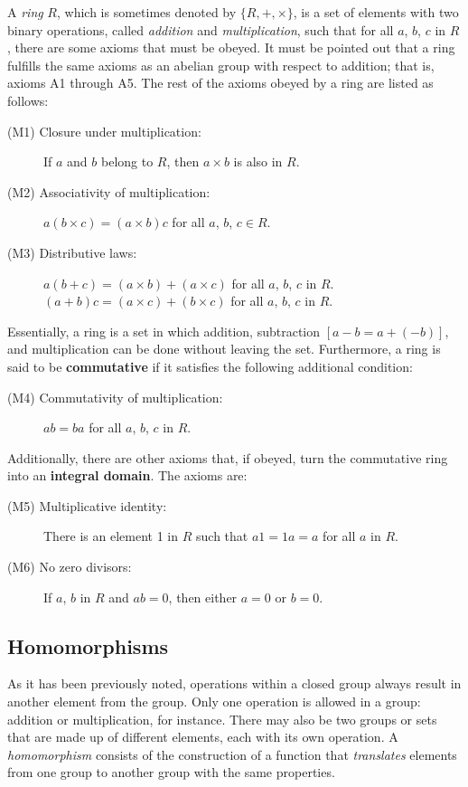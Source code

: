 A \emph{ring} $R$, which is sometimes denoted by $\{R, +, \times \}$, is a set of elements with two binary operations, called \textit{addition} and \textit{multiplication}, such that for all $a$, $b$, $c$ in $R$, there are some axioms that must be obeyed. It must be pointed out that a ring fulfills the same axioms as an abelian group with respect to addition; that is, axioms A1 through A5. The rest of the axioms obeyed by a ring are listed as follows:
\begin{description}
\item[(M1) Closure under multiplication:] If $a$ and $b$ belong to $R$, then $a \times b$ is also in $R$.
\item[(M2) Associativity of multiplication:] $a(b \times c) = (a \times b)c$ for all $a$, $b$, $c \in R$.
\item[(M3) Distributive laws:] $a(b+c) = (a \times b) + (a \times c)$ for all $a$, $b$, $c$ in $R$. \\ $(a+b)c = (a \times c) + (b \times c)$ for all $a$, $b$, $c$ in $R$.
\end{description}

Essentially, a ring is a set in which addition, subtraction $[a-b = a + (-b)]$, and multiplication can be done without leaving the set. Furthermore, a ring is said to be \textbf{commutative} if it satisfies the following additional condition:
\begin{description}
\item[(M4) Commutativity of multiplication:] $ab = ba$ for all $a$, $b$, $c$ in $R$.
\end{description}

Additionally, there are other axioms that, if obeyed, turn the commutative ring into an \textbf{integral domain}. The axioms are:  

\begin{description}
\item[(M5) Multiplicative identity:] There is an element 1 in $R$ such that $a1 = 1a = a$ for all $a$ in $R$.
\item[(M6) No zero divisors:] If $a$, $b$ in $R$ and $ab=0$, then either $a=0$ or $b=0$.
\end{description}

\subsection{Homomorphisms}

As it has been previously noted, operations within a closed group always result in another element from the group. Only one operation is allowed in a group: addition or multiplication, for instance. There may also be two groups or sets that are made up of different elements, each with its own operation. A \emph{homomorphism} consists of the construction of a function that \emph{translates} elements from one group to another group with the same properties.

